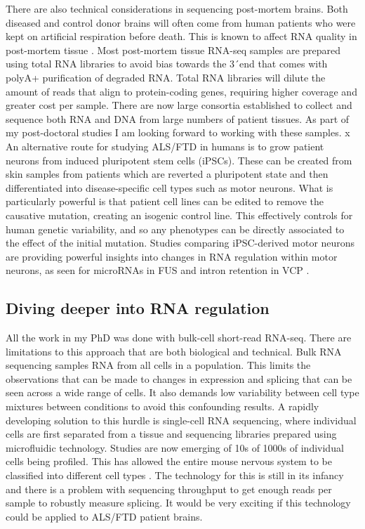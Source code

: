 There are also technical considerations in sequencing post-mortem brains.
Both diseased and control donor brains will often come from human patients who were kept on artificial respiration before death. 
This is known to affect RNA quality in post-mortem tissue \citep{Durrenberger2010}.
Most post-mortem tissue RNA-seq samples are prepared using total RNA libraries to avoid bias towards the 3\'\ end that comes with polyA+ purification of degraded RNA.
Total RNA libraries will dilute the amount of reads that align to protein-coding genes, requiring higher coverage and greater cost per sample.
There are now large consortia established to collect and sequence both RNA and DNA from large numbers of patient tissues. 
As part of my post-doctoral studies I am looking forward to working with these samples.
x
An alternative route for studying ALS/FTD in humans is to grow patient neurons from induced pluripotent stem cells (iPSCs).
These can be created from skin samples from patients which are reverted a pluripotent state and then differentiated into disease-specific cell types such as motor neurons.
What is particularly powerful is that patient cell lines can be edited to remove the causative mutation, creating an isogenic control line.
This effectively controls for human genetic variability, and so any phenotypes can be directly associated to the effect of the initial mutation.
Studies comparing iPSC-derived motor neurons are providing powerful insights into changes in RNA regulation within motor neurons, as seen for microRNAs in FUS \citep{DeSantis2017} and intron retention in VCP \citep{Luisier2018}. 

\subsection{Diving deeper into RNA regulation}

All the work in my PhD was done with bulk-cell short-read RNA-seq. 
There are limitations to this approach that are both biological and technical.
Bulk RNA sequencing samples RNA from all cells in a population. 
This limits the observations that can be made to changes in expression and splicing that can be seen across a wide range of cells.
It also demands low variability between cell type mixtures between conditions to avoid this confounding results.
A rapidly developing solution to this hurdle is single-cell RNA sequencing, where individual cells are first separated from a tissue and sequencing libraries prepared using microfluidic technology.
Studies are now emerging of 10s of 1000s of individual cells being profiled. 
This has allowed the entire mouse nervous system to be classified into different cell types \citep{Zeisel2018}. 
The technology for this is still in its infancy and there is a problem with sequencing throughput to get enough reads per sample to robustly measure splicing.
It would be very exciting if this technology could be applied to ALS/FTD patient brains. 

